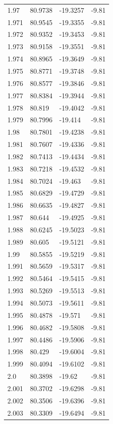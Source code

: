 \begin{tabular}{llll}
1.97 & 80.9738 & -19.3257 & -9.81 \\
1.971 & 80.9545 & -19.3355 & -9.81 \\
1.972 & 80.9352 & -19.3453 & -9.81 \\
1.973 & 80.9158 & -19.3551 & -9.81 \\
1.974 & 80.8965 & -19.3649 & -9.81 \\
1.975 & 80.8771 & -19.3748 & -9.81 \\
1.976 & 80.8577 & -19.3846 & -9.81 \\
1.977 & 80.8384 & -19.3944 & -9.81 \\
1.978 & 80.819 & -19.4042 & -9.81 \\
1.979 & 80.7996 & -19.414 & -9.81 \\
1.98 & 80.7801 & -19.4238 & -9.81 \\
1.981 & 80.7607 & -19.4336 & -9.81 \\
1.982 & 80.7413 & -19.4434 & -9.81 \\
1.983 & 80.7218 & -19.4532 & -9.81 \\
1.984 & 80.7024 & -19.463 & -9.81 \\
1.985 & 80.6829 & -19.4729 & -9.81 \\
1.986 & 80.6635 & -19.4827 & -9.81 \\
1.987 & 80.644 & -19.4925 & -9.81 \\
1.988 & 80.6245 & -19.5023 & -9.81 \\
1.989 & 80.605 & -19.5121 & -9.81 \\
1.99 & 80.5855 & -19.5219 & -9.81 \\
1.991 & 80.5659 & -19.5317 & -9.81 \\
1.992 & 80.5464 & -19.5415 & -9.81 \\
1.993 & 80.5269 & -19.5513 & -9.81 \\
1.994 & 80.5073 & -19.5611 & -9.81 \\
1.995 & 80.4878 & -19.571 & -9.81 \\
1.996 & 80.4682 & -19.5808 & -9.81 \\
1.997 & 80.4486 & -19.5906 & -9.81 \\
1.998 & 80.429 & -19.6004 & -9.81 \\
1.999 & 80.4094 & -19.6102 & -9.81 \\
2.0 & 80.3898 & -19.62 & -9.81 \\
2.001 & 80.3702 & -19.6298 & -9.81 \\
2.002 & 80.3506 & -19.6396 & -9.81 \\
2.003 & 80.3309 & -19.6494 & -9.81 \\

\end{tabular}
